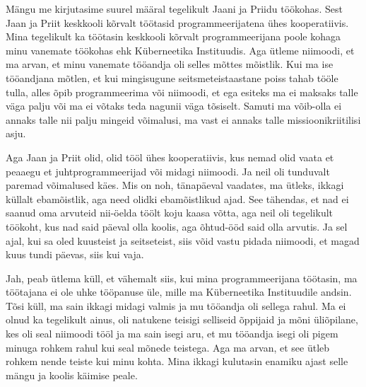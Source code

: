 Mängu me kirjutasime suurel määral tegelikult Jaani 
ja Priidu töökohas. Sest Jaan ja Priit keskkooli 
kõrvalt töötasid programmeerijatena ühes kooperatiivis. Mina tegelikult ka 
töötasin keskkooli kõrvalt programmeerijana poole kohaga minu vanemate töökohas 
ehk Küberneetika Instituudis. Aga  ütleme 
niimoodi, et ma arvan, et  minu vanemate tööandja oli selles mõttes mõistlik. 
Kui ma ise tööandjana mõtlen, et kui mingisugune seitsmeteistaastane poiss 
tahab tööle tulla,  alles õpib programmeerima või niimoodi, et ega esiteks ma 
ei maksaks talle väga palju või ma ei võtaks teda nagunii väga tõsiselt.  
Samuti ma võib-olla ei annaks talle nii palju mingeid võimalusi, ma vast ei 
annaks talle missioonikriitilisi asju. 

Aga Jaan ja Priit olid, olid tööl ühes kooperatiivis, kus nemad olid vaata et 
 peaaegu et juhtprogrammeerijad või midagi niimoodi.  Ja neil oli 
tunduvalt paremad võimalused  käes. Mis on noh, tänapäeval vaadates, ma ütleks, 
ikkagi küllalt ebamõistlik, aga need olidki  ebamõistlikud ajad. See tähendas, et 
nad ei saanud oma arvuteid nii-öelda töölt koju kaasa võtta, aga neil oli 
tegelikult töökoht, kus nad said päeval  olla koolis, aga õhtud-ööd said olla 
arvutis. Ja sel ajal,  kui sa oled kuusteist ja seitseteist, siis võid vastu 
pidada niimoodi, et magad kuus tundi päevas, siis kui vaja.


Jah, peab ütlema küll,  et vähemalt siis, kui mina  programmeerijana töötasin, 
ma töötajana ei ole uhke tööpanuse üle, mille ma Küberneetika Instituudile 
andsin. Tõsi küll,  ma sain ikkagi midagi valmis 
ja mu tööandja oli sellega rahul. Ma ei olnud ka tegelikult ainus, oli natukene 
teisigi selliseid õppijaid ja mõni üliõpilane, kes oli seal niimoodi tööl ja ma 
sain isegi aru, et mu tööandja isegi oli pigem minuga rohkem rahul kui seal 
mõnede teistega. Aga ma arvan, et see ütleb rohkem nende teiste  kui 
minu kohta. Mina ikkagi kulutasin enamiku ajast selle mängu ja koolis käimise 
peale.


